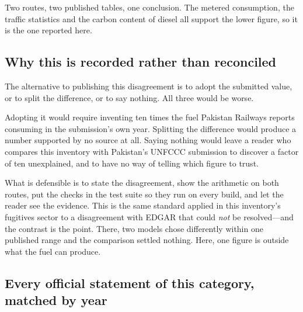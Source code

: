 Two routes, two published tables, one conclusion. The metered consumption, the traffic
statistics and the carbon content of diesel all support the lower figure, so it is the one
reported here.

\subsection{Why this is recorded rather than reconciled}

The alternative to publishing this disagreement is to adopt the submitted value, or to split
the difference, or to say nothing. All three would be worse.

Adopting it would require inventing ten times the fuel Pakistan Railways reports consuming in
the submission's own year.
Splitting the difference would produce a number supported by no source at all. Saying nothing
would leave a reader who compares this inventory with Pakistan's UNFCCC submission to discover
a factor of ten unexplained, and to have no way of telling which figure to trust.

What is defensible is to state the disagreement, show the arithmetic on both routes, put the
checks in the test suite so they run on every build, and let the reader see the evidence. This
is the same standard applied in this inventory's fugitives sector to a disagreement with EDGAR
that could \emph{not} be resolved---and the contrast is the point. There, two models chose
differently within one published range and the comparison settled nothing. Here, one figure is
outside what the fuel can produce.

\subsection{Every official statement of this category, matched by year}


